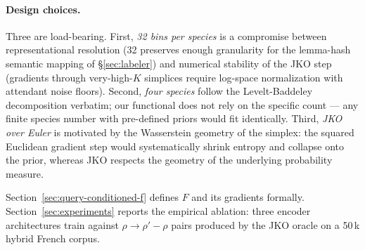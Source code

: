 \paragraph{Design choices.} Three are load-bearing. First,
\emph{32 bins per species} is a compromise between representational
resolution (32 preserves enough granularity for the lemma-hash
semantic mapping of \S\ref{sec:labeler}) and numerical stability
of the JKO step (gradients through very-high-$K$ simplices require
log-space normalization with attendant noise floors). Second,
\emph{four species} follow the Levelt-Baddeley decomposition
\citep{levelt1989speaking, baddeley1974} verbatim; our functional
does not rely on the specific count --- any finite species number
with pre-defined priors would fit identically. Third, \emph{JKO
over Euler} is motivated by the Wasserstein geometry of the
simplex: the squared Euclidean gradient step would systematically
shrink entropy and collapse onto the prior, whereas JKO respects
the geometry of the underlying probability measure.

Section~\ref{sec:query-conditioned-f} defines $F$ and its
gradients formally. Section~\ref{sec:experiments} reports the
empirical ablation: three encoder architectures train against
$\rho \to \rho' - \rho$ pairs produced by the JKO oracle on a
50\,k hybrid French corpus.
